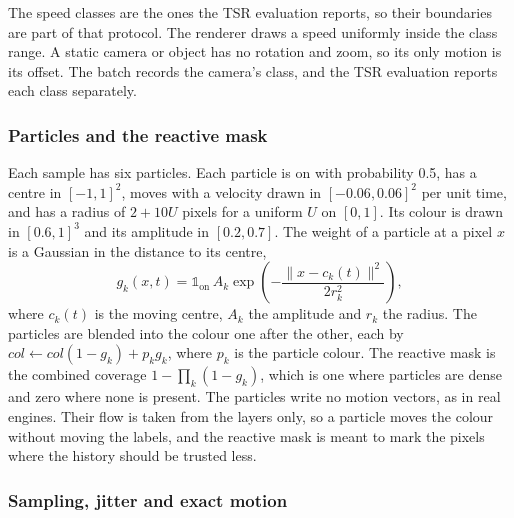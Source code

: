The speed classes are the ones the TSR evaluation reports, so their boundaries are part of that protocol. The renderer draws a speed uniformly inside the class range. A static camera or object has no rotation and zoom, so its only motion is its offset. The batch records the camera's class, and the TSR evaluation reports each class separately.

\subsubsection{Particles and the reactive mask}\label{sec:data-synth-particles}

Each sample has six particles. Each particle is on with probability 0.5, has a centre in $[-1,1]^2$, moves with a velocity drawn in $[-0.06,0.06]^2$ per unit time, and has a radius of $2+10U$ pixels for a uniform $U$ on $[0,1]$. Its colour is drawn in $[0.6,1]^3$ and its amplitude in $[0.2,0.7]$. The weight of a particle at a pixel $x$ is a Gaussian in the distance to its centre,
\begin{equation}
g_k(x,t)=\mathbb{1}_{\text{on}}\,A_k\exp\!\left(-\frac{\lVert x-c_k(t)\rVert^2}{2r_k^2}\right),\label{eq:data-particle}
\end{equation}
where $c_k(t)$ is the moving centre, $A_k$ the amplitude and $r_k$ the radius. The particles are blended into the colour one after the other, each by $col\leftarrow col(1-g_k)+p_k g_k$, where $p_k$ is the particle colour. The reactive mask is the combined coverage $1-\prod_k(1-g_k)$, which is one where particles are dense and zero where none is present. The particles write no motion vectors, as in real engines. Their flow is taken from the layers only, so a particle moves the colour without moving the labels, and the reactive mask is meant to mark the pixels where the history should be trusted less.

\subsubsection{Sampling, jitter and exact motion}\label{sec:data-synth-sampling}

